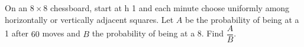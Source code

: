 On an $8\times8$ chessboard, start at h 1 and each minute choose uniformly among horizontally or vertically adjacent squares. Let $A$ be the probability of being at a 1 after $60$ moves and $B$ the probability of being at a 8. Find $\dfrac{A}{B}$.
